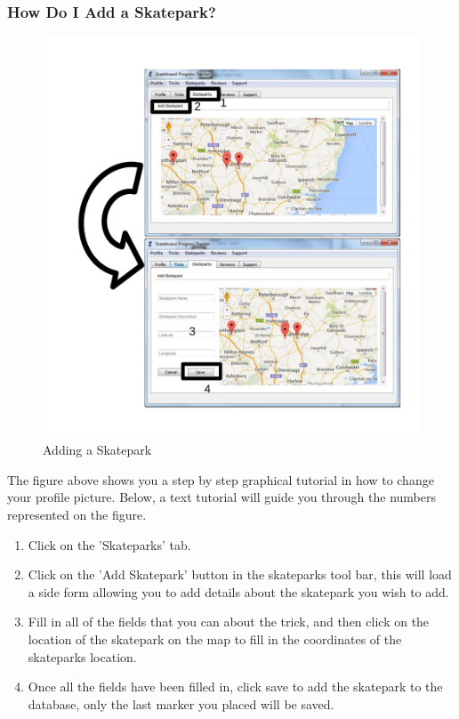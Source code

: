 \subsubsection{How Do I Add a Skatepark?} \label{AddSkatepark}

\begin{figure}[H]
    \includegraphics[width=\textwidth]{./Manual/Images/AddSkatepark.pdf}
    \caption{Adding a Skatepark} \label{fig:Add Skatepark}
\end{figure}

The figure above shows you a step by step graphical tutorial in how to change your profile picture. Below, a text tutorial will guide you through the numbers represented on the figure.

\begin{enumerate}
\item Click on the 'Skateparks' tab.
\item Click on the 'Add Skatepark' button in the skateparks tool bar, this will load a side form allowing you to add details about the skatepark you wish to add.
\item Fill in all of the fields that you can about the trick, and then click on the location of the skatepark on the map to fill in the coordinates of the skateparks location.
\item Once all the fields have been filled in, click save to add the skatepark to the database, only the last marker you placed will be saved.
\end{enumerate}

